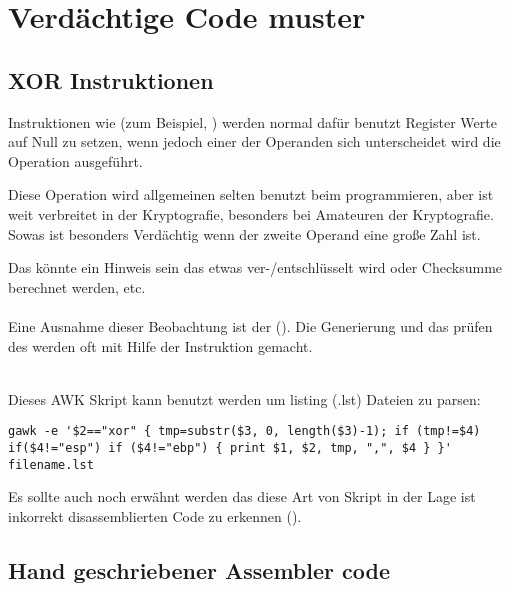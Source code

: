 \section{Verd\"achtige Code muster}

\subsection{XOR Instruktionen}

Instruktionen wie  (zum Beispiel, )
werden normal daf\"ur benutzt Register Werte auf Null zu setzen, wenn jedoch
einer der Operanden sich unterscheidet wird die  Operation 
ausgef\"uhrt.

Diese Operation wird allgemeinen selten benutzt beim programmieren, aber ist
weit verbreitet in der Kryptografie, besonders bei Amateuren der Kryptografie.
Sowas ist besonders Verd\"achtig wenn der zweite Operand eine große Zahl ist.

Das k\"onnte ein Hinweis sein das etwas ver-/entschl\"usselt wird oder Checksumme berechnet werden, etc.\\
\\

Eine Ausnahme dieser Beobachtung ist der  (). 
Die Generierung und das pr\"ufen des  werden oft mit Hilfe der \XOR Instruktion gemacht. \\
\\



Dieses AWK Skript kann benutzt werden um \IDA{} listing (.lst) Dateien zu parsen:

\begin{lstlisting}
gawk -e '$2=="xor" { tmp=substr($3, 0, length($3)-1); if (tmp!=$4) if($4!="esp") if ($4!="ebp") { print $1, $2, tmp, ",", $4 } }' filename.lst
\end{lstlisting}

Es sollte auch noch erw\"ahnt werden das diese Art von Skript in der Lage ist inkorrekt disassemblierten Code zu erkennen
().

\subsection{Hand geschriebener Assembler code}


